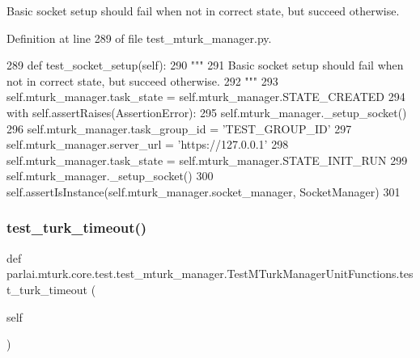 \begin{DoxyVerb}Basic socket setup should fail when not in correct state, but succeed otherwise.
\end{DoxyVerb}
 

Definition at line 289 of file test\+\_\+mturk\+\_\+manager.\+py.


\begin{DoxyCode}
289     \textcolor{keyword}{def }test\_socket\_setup(self):
290         \textcolor{stringliteral}{"""}
291 \textcolor{stringliteral}{        Basic socket setup should fail when not in correct state, but succeed otherwise.}
292 \textcolor{stringliteral}{        """}
293         self.mturk\_manager.task\_state = self.mturk\_manager.STATE\_CREATED
294         with self.assertRaises(AssertionError):
295             self.mturk\_manager.\_setup\_socket()
296         self.mturk\_manager.task\_group\_id = \textcolor{stringliteral}{'TEST\_GROUP\_ID'}
297         self.mturk\_manager.server\_url = \textcolor{stringliteral}{'https://127.0.0.1'}
298         self.mturk\_manager.task\_state = self.mturk\_manager.STATE\_INIT\_RUN
299         self.mturk\_manager.\_setup\_socket()
300         self.assertIsInstance(self.mturk\_manager.socket\_manager, SocketManager)
301 
\end{DoxyCode}
\mbox{\label{classparlai_1_1mturk_1_1core_1_1test_1_1test__mturk__manager_1_1TestMTurkManagerUnitFunctions_a7bf3c2117a8b24385602fd550626a6f7}} 
\subsubsection{\texorpdfstring{test\+\_\+turk\+\_\+timeout()}{test\_turk\_timeout()}}
{\footnotesize\ttfamily def parlai.\+mturk.\+core.\+test.\+test\+\_\+mturk\+\_\+manager.\+Test\+M\+Turk\+Manager\+Unit\+Functions.\+test\+\_\+turk\+\_\+timeout (\begin{DoxyParamCaption}\item[{}]{self }\end{DoxyParamCaption})}

